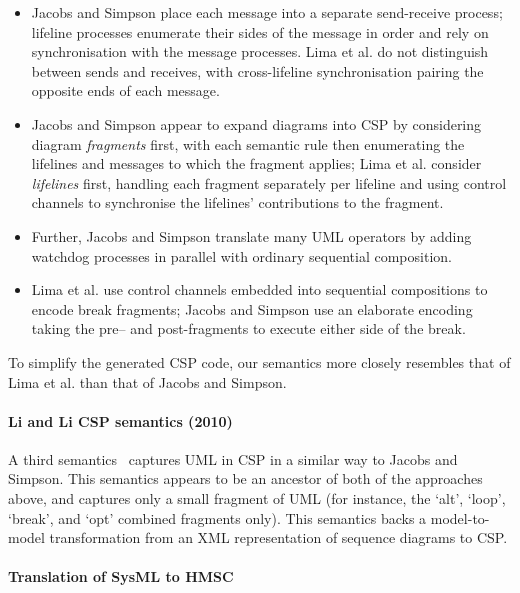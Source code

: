 \begin{itemize}
\item
  Jacobs and Simpson place each message into a
  separate send-receive process; lifeline processes enumerate their
  sides of the message in order and rely on
  synchronisation with the message processes.
  Lima et al. do not
  distinguish between sends and receives, with
  cross-lifeline synchronisation pairing the opposite
  ends of each message.
\item
  Jacobs and Simpson appear to expand diagrams into CSP by
  considering diagram \emph{fragments} first, with each semantic rule
  then enumerating the lifelines and messages to which the fragment applies;
  Lima et al. consider \emph{lifelines} first, handling each fragment
  separately per lifeline and using control channels to synchronise the
  lifelines' contributions to the fragment.
\item
  Further, Jacobs and Simpson translate many UML operators by adding watchdog
  processes in parallel with ordinary sequential composition.
\item
  Lima et al. use control channels embedded into sequential compositions to
  encode break fragments;
  Jacobs and Simpson use an elaborate encoding taking the pre-- and
  post-fragments to execute either side of the break.
\end{itemize}

To simplify the generated CSP code, our semantics more closely resembles that of
Lima et al. than that of Jacobs and Simpson.

\paragraph{Li and Li CSP semantics (2010)}

A third semantics~\cite{Li10-SeqCSP} captures UML in CSP in a similar
way to Jacobs and Simpson.  This semantics appears to be an ancestor of both
of the approaches above, and captures only a small fragment of UML (for
instance, the `alt', `loop', `break', and `opt' combined fragments only).
This semantics backs a model-to-model
transformation from an XML representation of sequence diagrams to CSP.

\paragraph{Translation of SysML to HMSC}

